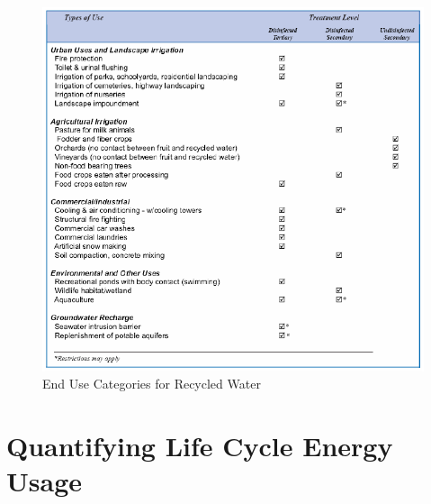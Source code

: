      \begin{figure}[End Use Categories for Recycled Water]
       \centering
       \includegraphics[width=5.5in]{figures/use-categories.png}
       \caption[End Use Categories for Recycled Water]{End Use Categories for Recycled Water}
       \label{fig:use-categories}
     \end{figure}        
              
 \section{Quantifying Life Cycle Energy Usage}

